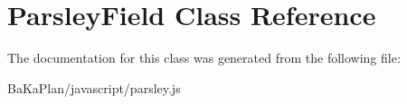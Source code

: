 \hypertarget{classParsleyField}{\section{Parsley\-Field Class Reference}
\label{classParsleyField}
}


The documentation for this class was generated from the following file\-:\begin{DoxyCompactItemize}
\item 
Ba\-Ka\-Plan/javascript/parsley.\-js\end{DoxyCompactItemize}
